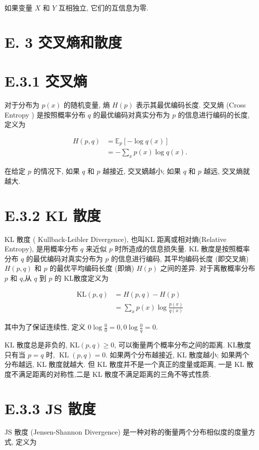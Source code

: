 \documentclass[10pt]{article}
\begin{document}
如果变量 $X$ 和 $Y$ 互相独立, 它们的互信息为零.

\section*{E. 3 交叉熵和散度}
\section*{E.3.1 交叉熵}
对于分布为 $p(x)$ 的随机变量, 熵 $H(p)$ 表示其最优编码长度. 交叉熵 (Cross Entropy ) 是按照概率分布 $q$ 的最优编码对真实分布为 $p$ 的信息进行编码的长度,定义为


\begin{align*}
H(p, q) & =\mathbb{E}_{p}[-\log q(x)]  \tag{E.12}\\
& =-\sum_{x} p(x) \log q(x) . \tag{E.13}
\end{align*}


在给定 $p$ 的情况下, 如果 $q$ 和 $p$ 越接近, 交叉嫡越小; 如果 $q$ 和 $p$ 越远, 交叉熵就越大.

\section*{E.3.2 KL 散度}
KL 散度 ( Kullback-Leibler Divergence), 也叫KL 距离或相对熵(Relative Entropy), 是用概率分布 $q$ 来近似 $p$ 时所造成的信息损失量. KL 散度是按照概率分布 $q$ 的最优编码对真实分布为 $p$ 的信息进行编码, 其平均编码长度 (即交叉熵) $H(p, q)$ 和 $p$ 的最优平均编码长度 (即熵) $H(p)$ 之间的差异. 对于离散概率分布 $p$ 和 $q$,从 $q$ 到 $p$ 的 KL散度定义为


\begin{align*}
\mathrm{KL}(p, q) & =H(p, q)-H(p)  \tag{E.14}\\
& =\sum_{x} p(x) \log \frac{p(x)}{q(x)} \tag{E.15}
\end{align*}


其中为了保证连续性, 定义 $0 \log \frac{0}{0}=0,0 \log \frac{0}{q}=0$.

$\mathrm{KL}$ 散度总是非负的, $\mathrm{KL}(p, q) \geq 0$, 可以衡量两个概率分布之间的距离. $\mathrm{KL}$散度只有当 $p=q$ 时, $\operatorname{KL}(p, q)=0$. 如果两个分布越接近, $\mathrm{KL}$ 散度越小; 如果两个分布越远, KL 散度就越大. 但 KL 散度并不是一个真正的度量或距离, 一是 KL 散度不满足距离的对称性,二是 KL 散度不满足距离的三角不等式性质.

\section*{E.3.3 JS 散度}
JS 散度 (Jensen-Shannon Divergence) 是一种对称的衡量两个分布相似度的度量方式, 定义为
\end{document}
